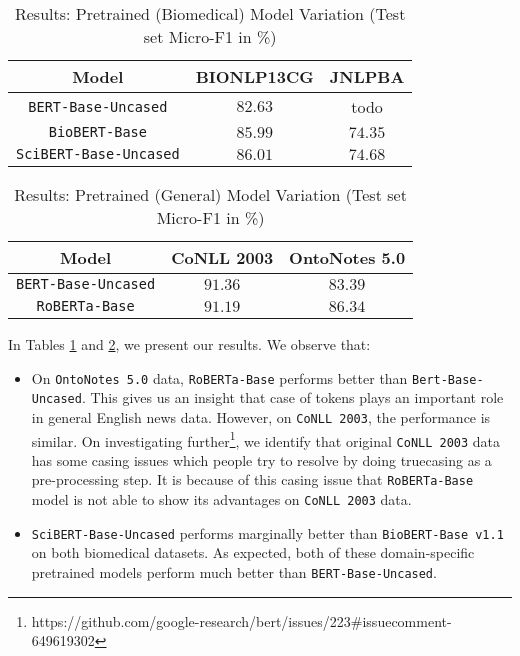 \begin{table}[h!]
\centering
\begin{tabular}{|c|c|c|}\hline
	\textbf{Model} & \textbf{BIONLP13CG} & \textbf{JNLPBA}\\\hline
	\texttt{BERT-Base-Uncased} & $82.63$ & todo\\\hline
	\texttt{BioBERT-Base} & $85.99$ & $74.35$\\\hline
	\texttt{SciBERT-Base-Uncased} & $86.01$ & $74.68$\\\hline
	\end{tabular}
    \caption{Results: Pretrained (Biomedical) Model Variation (Test set Micro-F1 in \%)}
    \label{tab:res_pretrained_model_bio}
\end{table}

\begin{table}[h!]
\centering
\begin{tabular}{|c|c|c|}\hline
	\textbf{Model} & \textbf{CoNLL 2003} & \textbf{OntoNotes 5.0}\\\hline
	\texttt{BERT-Base-Uncased} & $91.36$ & $83.39$\\\hline
	\texttt{RoBERTa-Base} & $91.19$ & $86.34$\\\hline
	\end{tabular}
    \caption{Results: Pretrained (General) Model Variation (Test set Micro-F1 in \%)}
    \label{tab:res_pretrained_model_general}
\end{table}

In Tables \ref{tab:res_pretrained_model_bio} and \ref{tab:res_pretrained_model_general}, we present our results. We observe that:

\begin{itemize}
    \item On \texttt{OntoNotes 5.0} data, \texttt{RoBERTa-Base} performs better than \texttt{Bert-Base-Uncased}. This gives us an insight that case of tokens plays an important role in general English news data. However, on \texttt{CoNLL 2003}, the performance is similar. On investigating further\footnote{https://github.com/google-research/bert/issues/223\#issuecomment-649619302}, we identify that original \texttt{CoNLL 2003} data has some casing issues which people try to resolve by doing truecasing as a pre-processing step. It is because of this casing issue that \texttt{RoBERTa-Base} model is not able to show its advantages on \texttt{CoNLL 2003} data.
    
    \item \texttt{SciBERT-Base-Uncased} performs marginally better than \texttt{BioBERT-Base v1.1} on both biomedical datasets. As expected, both of these domain-specific pretrained models perform much better than \texttt{BERT-Base-Uncased}. 
\end{itemize}

